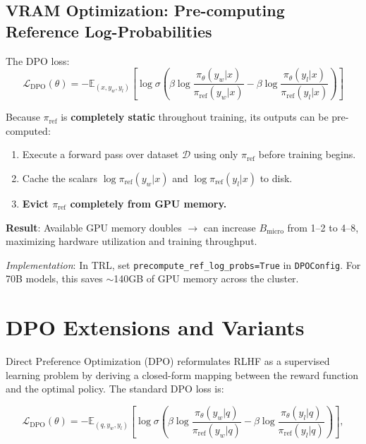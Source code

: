 \subsection{VRAM Optimization: Pre-computing Reference Log-Probabilities}
\label{vram-optimization-pre-computing-reference-log-probabilities}

The DPO loss: 
\begin{equation}
\mathcal{L}_{\text{DPO}}(\theta) = -\mathbb{E}_{(x, y_w, y_l)}\!\left[\log \sigma\!\left(\beta \log \frac{\pi_\theta(y_w|x)}{\pi_{\text{ref}}(y_w|x)} - \beta \log \frac{\pi_\theta(y_l|x)}{\pi_{\text{ref}}(y_l|x)}\right)\right]
\end{equation}

Because $\pi_{\text{ref}}$ is \textbf{completely static} throughout training, its outputs can be pre-computed:

\begin{keybox}
\begin{enumerate}
  \item Execute a forward pass over dataset $\mathcal{D}$ using only $\pi_{\text{ref}}$ before training begins.
  \item Cache the scalars $\log \pi_{\text{ref}}(y_w|x)$ and $\log \pi_{\text{ref}}(y_l|x)$ to disk.
  \item \textbf{Evict $\pi_{\text{ref}}$ completely from GPU memory.}
\end{enumerate}

\textbf{Result}: Available GPU memory doubles $\rightarrow$ can increase $B_{\text{micro}}$ from 1--2 to 4--8, maximizing hardware utilization and training throughput.

\emph{Implementation}: In TRL, set \texttt{precompute\_ref\_log\_probs=True} in \texttt{DPOConfig}. For 70B models, this saves $\sim$140GB of GPU memory across the cluster.
\end{keybox}

\section{DPO Extensions and Variants}
\label{sec:dpo-variants}

Direct Preference Optimization (DPO) reformulates RLHF as a supervised learning problem by deriving a closed-form mapping between the reward function and the optimal policy. The standard DPO loss is:

\[
\mathcal{L}_{\text{DPO}}(\theta) = -\mathbb{E}_{(q,y_w,y_l)}\!\left[
    \log \sigma\!\left(
      \beta \log \frac{\pi_\theta(y_w|q)}{\pi_{\text{ref}}(y_w|q)}
      - \beta \log \frac{\pi_\theta(y_l|q)}{\pi_{\text{ref}}(y_l|q)}
    \right)
  \right],
\]

